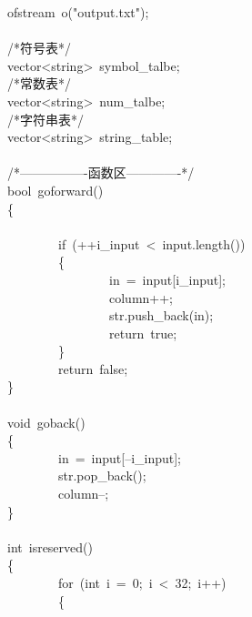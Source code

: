\documentclass{article}
\begin{document}
\begin{mdpre}
ofstream~o({"}{output.txt}{"});\\
\\
{/*}{符号表}{*/}\\
vector\textless{}string\textgreater{}~symbol\_talbe;\\
{/*}{常数表}{*/}\\
vector\textless{}string\textgreater{}~num\_talbe;\\
{/*}{字符串表}{*/}\\
vector\textless{}string\textgreater{}~string\_table;\\
\\
{/*}{----------------函数区-------------}{*/}\\
{bool}~goforward()\\
\{\\
\\
~~~~~~~~{if}~(++i\_input~\textless{}~input.length())\\
~~~~~~~~\{\\
~~~~~~~~~~~~~~~~in~=~input{}[i\_input];\\
~~~~~~~~~~~~~~~~column++;\\
~~~~~~~~~~~~~~~~str.push\_back(in);\\
~~~~~~~~~~~~~~~~{return}~{true};\\
~~~~~~~~\}\\
~~~~~~~~{return}~{false};\\
\}\\
\\
{void}~goback()\\
\{\\
~~~~~~~~in~=~input{}[--i\_input];\\
~~~~~~~~str.pop\_back();\\
~~~~~~~~column--;\\
\}\\
\\
{int}~isreserved()\\
\{\\
~~~~~~~~{for}~({int}~i~=~{0};~i~\textless{}~{32};~i++)\\
~~~~~~~~\{\\

\end{mdpre}
\end{document}
